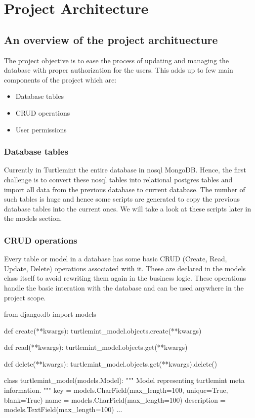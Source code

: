 \chapter{Project Architecture}

\section{An overview of the project archituecture}
The project objective is to ease the process of updating and managing the
database with proper authorization for the users. This adds up to few main
components of the project which are:

\begin{itemize}
    \item Database tables
    \item CRUD operations
    \item User permissions
\end{itemize}

\subsection{Database tables}
Currently in Turtlemint the entire database in nosql MongoDB. Hence, the first
challenge is to convert these nosql tables into relational postgres tables and
import all data from the previous database to current database. The number of
such tables is huge and hence some scripts are generated to copy the previous
database tables into the current ones. We will take a look at these scripts
later in the models section.

\subsection{CRUD operations}
Every table or model in a database has some basic CRUD (Create, Read, Update,
Delete) operations associated with it. These are declared in the models class
itself to avoid rewriting them again in the business logic. These operations
handle the basic interation with the database and can be used anywhere in the
project scope.

\begin{pythoncode}
from django.db import models

def create(**kwargs):
    turtlemint_model.objects.create(**kwargs)

def read(**kwargs):
    turtlemint_model.objects.get(**kwargs)

def delete(**kwargs):
    turtlemint_model.objects.get(**kwargs).delete()

class turtlemint_model(models.Model):
    """
    Model representing turtlemint meta information.
    """
    key = models.CharField(max_length=100, unique=True, blank=True)
    name = models.CharField(max_length=100)
    description = models.TextField(max_length=100)
    ...
\end{pythoncode}

